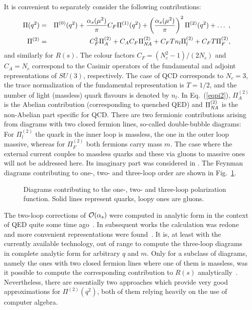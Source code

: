 It is convenient to separately consider the following contributions:
\begin{eqnarray}
\Pi(q^2) &=& \Pi^{(0)}(q^2) 
         + \frac{\alpha_s(\mu^2)}{\pi} C_F \Pi^{(1)}(q^2)
         + \left(\frac{\alpha_s(\mu^2)}{\pi}\right)^2\Pi^{(2)}(q^2)
         + \ldots\,\,,
\\
\Pi^{(2)} &=&
                C_F^2       \Pi_A^{(2)}
              + C_A C_F     \Pi_{\it NA}^{(2)}
              + C_F T   n_l \Pi_l^{(2)}
              + C_F T       \Pi_F^{(2)},
\label{eqpi2}
\end{eqnarray}
and similarly for $R(s)$.  The colour factors $C_F=(N_c^2-1)/(2N_c)$
and $C_A=N_c$ correspond to the Casimir operators of the fundamental
and adjoint representations of $SU(3)$, respectively.  The case of QCD
corresponds to $N_c=3$, the trace normalization of the fundamental
representation is $T=1/2$, and the number of light (massless) quark
flavours is denoted by $n_l$.  In Eq.~(\ref{eqpi2}), $\Pi_A^{(2)}$ is
the Abelian contribution (corresponding to quenched QED) and 
$\Pi_{\it NA}^{(2)}$ is
the non-Abelian part specific for QCD.  There are two fermionic
contributions arising from diagrams with two closed fermion lines,
so-called double-bubble diagrams: For $\Pi_l^{(2)}$ the quark in the
inner loop is massless, the one in the outer loop massive, whereas for
$\Pi_F^{(2)}$ both fermions carry mass $m$.  The case where the external
current couples to massless quarks and these via gluons to massive ones
will not be addressed here.  Its imaginary part was considered in
\cite{HoaJezKueTeu94}.  The Feynman diagrams contributing to one-, two-
and three-loop order are shown in Fig.~\ref{figpol}.

%
\begin{figure}
  \begin{center}
    \leavevmode
    \hfill
    \parbox{\captionwidth}{
    \caption[]{\label{figpol}\sloppy
      Diagrams contributing to the one-, two- and three-loop polarization
      function. Solid lines represent quarks, loopy ones are gluons.
      }}
  \end{center}
\end{figure}
%

The two-loop corrections of ${\cal O}(\alpha_s)$ were computed in
analytic form in the context of QED quite some time ago~\cite{KalSab55}.
In subsequent works the calculation was redone and more convenient
representations were found~\cite{BarRem73,Kni90,BroFleTar93}.  It is, at
least with the currently available technology, out of range to compute
the three-loop diagrams in complete analytic form for arbitrary $q$ and
$m$.  Only for a subclass of diagrams, namely the ones with two closed
fermion lines where one of them is massless, was it possible to compute
the corresponding contribution to $R(s)$
analytically~\cite{HoaJezKueTeu94,HoaKueTeu95,Teudiss,Hoadiss}.
Nevertheless, there are essentially two approaches which provide very
good approximations for $\Pi^{(2)}(q^2)$, both of them relying heavily
on the use of computer algebra.

